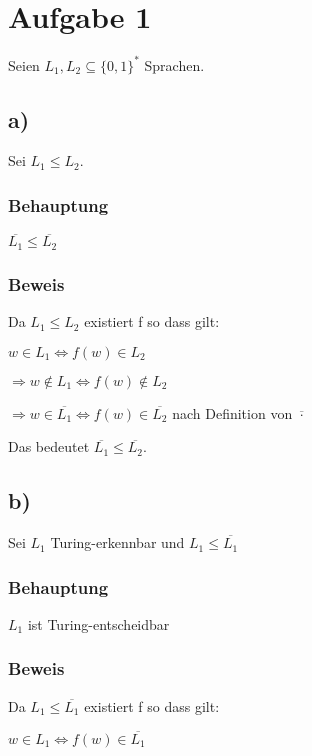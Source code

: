 \section*{Aufgabe 1}

Seien $L_1, L_2 \subseteq \{0,1\}^*$ Sprachen.

\subsection*{a)}

Sei $L_1 \leq L_2$.

\subsubsection*{Behauptung}

$\overline{L_1} \leq \overline{L_2}$

\subsubsection*{Beweis}

Da $L_1 \leq L_2$ existiert f so dass gilt:

$w \in L_1 \Leftrightarrow f(w) \in L_2$

$\Rightarrow w \notin L_1 \Leftrightarrow f(w) \notin L_2$

$\Rightarrow w \in \overline{L_1} \Leftrightarrow f(w) \in \overline{L_2}$ nach Definition von $\overline{\cdot}$

Das bedeutet $\overline{L_1} \leq \overline{L_2}$.


\subsection*{b)}

Sei $L_1$ Turing-erkennbar und $L_1 \leq \overline{L_1}$ 

\subsubsection*{Behauptung}

$L_1$ ist Turing-entscheidbar


\subsubsection*{Beweis}

Da $L_1 \leq \overline{L_1}$ existiert f so dass gilt:

$w \in L_1 \Leftrightarrow f(w) \in \overline{L_1}$

